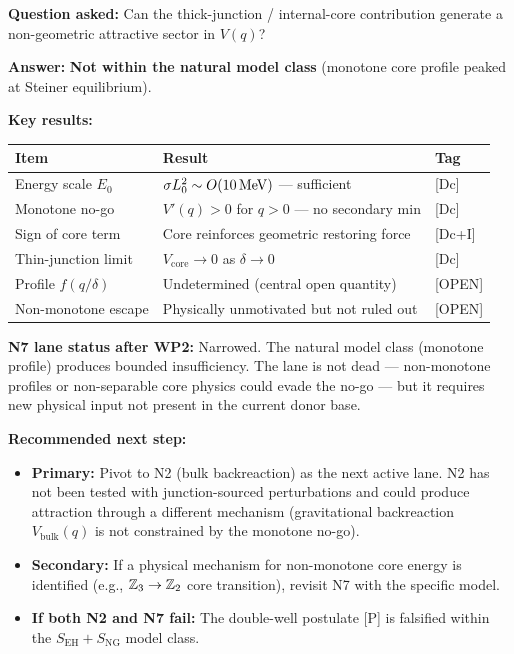 \begin{resultbox}[title=N7 WP2 Summary]
\textbf{Question asked:} Can the thick-junction / internal-core
contribution generate a non-geometric attractive sector in $V(q)$?

\textbf{Answer:} \textbf{Not within the natural model class} (monotone
core profile peaked at Steiner equilibrium).

\textbf{Key results:}
\begin{center}
\begin{tabular}{lll}
\toprule
\textbf{Item} & \textbf{Result} & \textbf{Tag} \\
\midrule
Energy scale $E_0$ & $\sigma L_0^2 \sim O(10\,\mathrm{MeV})$ --- sufficient
& [Dc] \\
Monotone no-go & $V'(q) > 0$ for $q > 0$ --- no secondary min
& [Dc] \\
Sign of core term & Core reinforces geometric restoring force
& [Dc+I] \\
Thin-junction limit & $V_{\mathrm{core}} \to 0$ as $\delta \to 0$
& [Dc] \\
Profile $f(q/\delta)$ & Undetermined (central open quantity)
& [OPEN] \\
Non-monotone escape & Physically unmotivated but not ruled out
& [OPEN] \\
\bottomrule
\end{tabular}
\end{center}

\textbf{N7 lane status after WP2:} Narrowed. The natural model class
(monotone profile) produces bounded insufficiency. The lane is not
dead --- non-monotone profiles or non-separable core physics could
evade the no-go --- but it requires new physical input not present
in the current donor base.

\textbf{Recommended next step:}
\begin{itemize}
    \item \textbf{Primary:} Pivot to N2 (bulk backreaction) as the next
          active lane. N2 has not been tested with junction-sourced
          perturbations and could produce attraction through a different
          mechanism (gravitational backreaction $V_{\mathrm{bulk}}(q)$
          is not constrained by the monotone no-go).
    \item \textbf{Secondary:} If a physical mechanism for non-monotone
          core energy is identified (e.g., $\mathbb{Z}_3 \to \mathbb{Z}_2$ core
          transition), revisit N7 with the specific model.
    \item \textbf{If both N2 and N7 fail:} The double-well postulate
          [P] is falsified within the $S_{\mathrm{EH}} + S_{\mathrm{NG}}$
          model class.
\end{itemize}


\end{resultbox}
